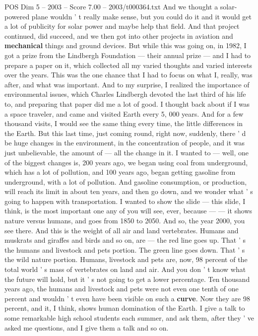 \begin{textsample}{POS Dim 5 – 2003 – Score 7.00 – 2003/t000364.txt}
And we thought a solar-powered plane wouldn ' t really make sense, but you could do it and it would get a lot of publicity for solar power and maybe help that field.
And that project continued, did succeed, and we then got into other projects in aviation and \textbf{mechanical} things and ground devices.
But while this was going on, in 1982, I got a prize from the Lindbergh Foundation — their annual prize — and I had to prepare a paper on it, which collected all my varied thoughts and varied interests over the years.
This was the one chance that I had to focus on what I, really, was after, and what was important.
And to my surprise, I realized the importance of environmental issues, which Charles Lindbergh devoted the last third of his life to, and preparing that paper did me a lot of good.
I thought back about if I was a space traveler, and came and visited Earth every 5, 000 years.
And for a few thousand visits, I would see the same thing every time, the little differences in the Earth.
But this last time, just coming round, right now, suddenly, there ' d be huge changes in the environment, in the concentration of people, and it was just unbelievable, the amount of — all the change in it.
I wanted to — well, one of the biggest changes is, 200 years ago, we began using coal from underground, which has a lot of pollution, and 100 years ago, began getting gasoline from underground, with a lot of pollution.
And gasoline consumption, or production, will reach its limit in about ten years, and then go down, and we wonder what ' s going to happen with transportation.
I wanted to show the slide — this slide, I think, is the most important one any of you will see, ever, because — — it shows nature versus humans, and goes from 1850 to 2050.
And so, the year 2000, you see there.
And this is the weight of all air and land vertebrates.
Humans and muskrats and giraffes and birds and so on, are — the red line goes up.
That ' s the humans and livestock and pets portion.
The green line goes down.
That ' s the wild nature portion.
Humans, livestock and pets are, now, 98 percent of the total world ' s mass of vertebrates on land and air.
And you don ' t know what the future will hold, but it ' s not going to get a lower percentage.
Ten thousand years ago, the humans and livestock and pets were not even one tenth of one percent and wouldn ' t even have been visible on such a \textbf{curve}.
Now they are 98 percent, and it, I think, shows human domination of the Earth.
I give a talk to some remarkable high school students each summer, and ask them, after they ' ve asked me questions, and I give them a talk and so on.

\end{textsample}
